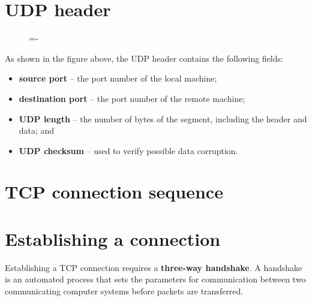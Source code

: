 \documentclass[a4paper]{systems-software}
\begin{document}
\section*{UDP header}

\begin{figure}[H]
	\lineskip=-\fboxrule
\end{figure}

\newpage

As shown in the figure above, the UDP header contains the following fields:
\begin{itemize}
	\item \textbf{source port} -- the port number of the local machine;
	\item \textbf{destination port} -- the port number of the remote machine;
	\item \textbf{UDP length} -- the number of bytes of the segment, including the header and data; and
	\item \textbf{UDP checksum} -- used to verify possible data corruption.
\end{itemize}


\section{TCP connection sequence}

\section*{Establishing a connection}

Establishing a TCP connection requires a \textbf{three-way handshake}. A handshake is an automated process that sets the parameters for communication between two communicating computer systems before packets are transferred.
\end{document}
